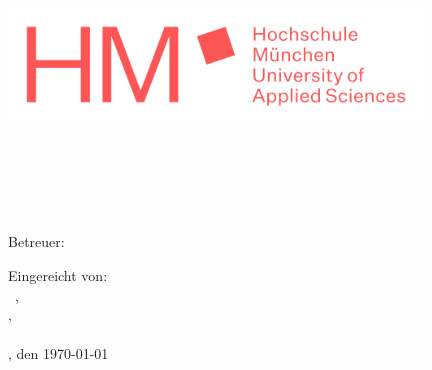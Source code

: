 \begin{titlepage}
    \pagestyle{empty}
    
    \begin{center}	
    
    \includegraphics[height=3cm]{content/pictures/hm.png}
    
    \vspace{1cm}

    \docFakultaet\\
    \docStudiengang\\

    \vspace{3cm}
    {\huge \docArtDerArbeit}\\

    \vspace{2cm}
    {\Huge \docTitle}\\
    \vspace{0.5cm}
    {\selectfont \docUntertitle}

    \vspace{2cm}
    Betreuer: \docErsterReferent\\

    \end{center}

    \vspace{2cm}
    \begin{flushright}
    Eingereicht von: \\
    \docVorname~\docNachname, \docMatrikelnummer\\
    \docStrasse,~\docPlz~\docOrt\\
    \docEmail\\


    \vspace{0.7cm}
    \docOrt, den \today
    \end{flushright}

    \end{titlepage}